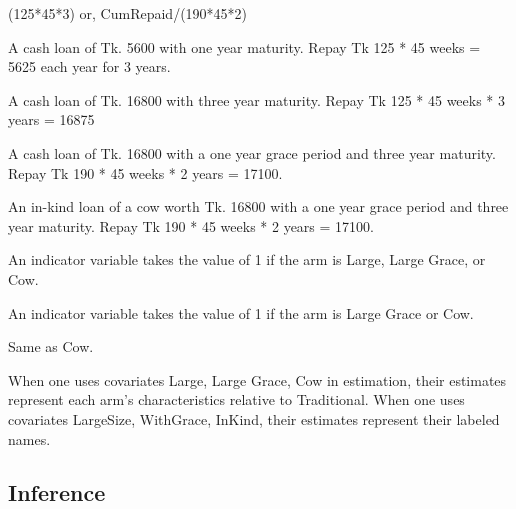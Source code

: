 (125*45*3) or, CumRepaid/(190*45*2)
\begin{description}
\vspace{1.0ex}\setlength{\itemsep}{1.0ex}\setlength{\baselineskip}{12pt}
\item[Traditional]	A cash loan of Tk. 5600 with one year maturity. Repay Tk 125 * 45 weeks = 5625 each year for 3 years.
\item[Large]	A cash loan of Tk. 16800 with three year maturity. Repay Tk 125 * 45 weeks * 3 years = 16875
\item[Large Grace]	A cash loan of Tk. 16800 with a one year grace period and three year maturity. Repay Tk 190 * 45 weeks * 2 years = 17100.
\item[Cow]	An in-kind loan of a cow worth Tk. 16800 with a one year grace period and three year maturity. Repay Tk 190 * 45 weeks * 2 years = 17100.
\item[LargeSize]	An indicator variable takes the value of 1 if the arm is Large, Large Grace, or Cow.
\item[WithGrace]	An indicator variable takes the value of 1 if the arm is Large Grace or Cow.
\item[InKind]	Same as Cow.
\end{description}
When one uses covariates \textsf{Large, Large Grace, Cow} in estimation, their estimates represent each arm's characteristics relative to \textsf{Traditional}. When one uses covariates \textsf{LargeSize, WithGrace, InKind}, their estimates represent their labeled names.

\subsection{Inference}

